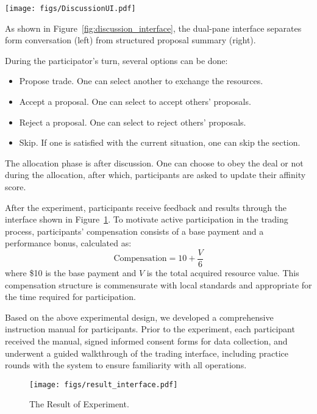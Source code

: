 \begin{figure*}[t]
\centering
\texttt{[image: figs/DiscussionUI.pdf]}
\caption{The Discussion Interface.}
\label{fig:discussion_interface}
\end{figure*}

As shown in Figure~\ref{fig:discussion_interface},  the dual-pane interface separates form conversation (left) from structured proposal summary (right). 

During the participator's turn, several options can be done:
\begin{itemize}
    \item Propose trade. One can select another to exchange the resources.
    \item Accept a proposal. One can select to accept others' proposals.
    \item Reject a proposal. One can select to reject others' proposals.
    \item Skip. If one is satisfied with the current situation, one can skip the section.
\end{itemize}

The allocation phase is after discussion. One can choose to obey the deal or not during the allocation, after which, participants are asked to update their affinity score.

After the experiment, participants receive feedback and results through the interface shown in Figure~\ref{fig:result_interface}. To motivate active participation in the trading process, participants' compensation consists of a base payment and a performance bonus, calculated as:
\begin{equation}
\text{Compensation} = 10 + \frac{V}{6}
\end{equation}
where \$10 is the base payment and $V$ is the total acquired resource value. This compensation structure is commensurate with local standards and appropriate for the time required for participation.

Based on the above experimental design, we developed a comprehensive instruction manual for participants. Prior to the experiment, each participant received the manual, signed informed consent forms for data collection, and underwent a guided walkthrough of the trading interface, including practice rounds with the system to ensure familiarity with all operations.


\begin{figure}[t]
\centering
\texttt{[image: figs/result\_interface.pdf]}
\caption{The Result of Experiment.}
\label{fig:result_interface}
\end{figure}

